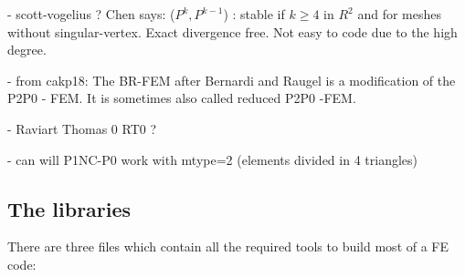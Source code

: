 - scott-vogelius ? Chen says: ($P^k ,P^{k-1}$) : stable if $k \ge 4$ in $R^2$ and for meshes without
singular-vertex. Exact divergence free. Not easy to code due to the high degree.

- from cakp18: The BR-FEM after Bernardi and Raugel \cite{bera85} is a modification of the P2P0 - FEM.
It is sometimes also called reduced P2P0 -FEM. \cite{}

- Raviart Thomas 0 RT0 \cite{rath77} ? 

- can will P1NC-P0 work with mtype=2 (elements divided in 4 triangles)



\subsection*{The libraries}

There are three files which contain all the required tools to build most of a FE code:

